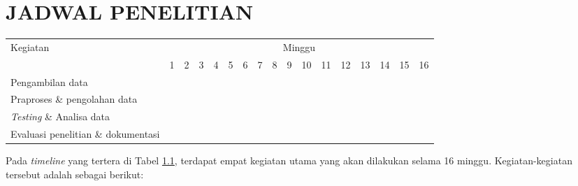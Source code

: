 \chapter{JADWAL PENELITIAN}
\label{chap:jadwalpenelitian}

\newcommand{\w}{}
\newcommand{\G}{\cellcolor{gray}}
\begin{table}[H]
  \label{tbl:timeline}
  \begin{tabular}{|p{3.5cm}|c|c|c|c|c|c|c|c|c|c|c|c|c|c|c|c|}

    \hline
    \multirow{2}{*}{Kegiatan} & \multicolumn{16}{|c|}{Minggu}                                                                       \\
    \cline{2-17}              &
    1                         & 2                             & 3  & 4  & 5  & 6  & 7  & 8  & 9  & 10 & 11 & 12 & 13 & 14 & 15 & 16 \\
    \hline

    Pengambilan data          &
    \G                        & \G                            & \G & \w & \w & \w & \w & \w & \w & \w & \w & \w & \w & \w & \w & \w \\
    \hline

    Praproses \& pengolahan data           &
    \w                        & \w                            & \G & \G & \G & \G & \G & \G & \w & \w & \w & \w & \w & \w & \w & \w \\
    \hline

    \emph{Testing} \& Analisa data              &
    \w                        & \w                            & \w & \w & \w & \w & \G & \G & \G & \G & \G & \w & \w & \w & \w & \w \\
    \hline

    Evaluasi penelitian \& dokumentasi       &
    \w                        & \w                            & \w & \w & \w & \w & \w & \w & \w & \w & \G & \G & \G & \G & \G & \G \\
    \hline
  \end{tabular}
\end{table}

Pada \emph{timeline} yang tertera di Tabel \ref{tbl:timeline}, terdapat empat kegiatan utama yang akan dilakukan selama 16 minggu. Kegiatan-kegiatan tersebut adalah sebagai berikut:

